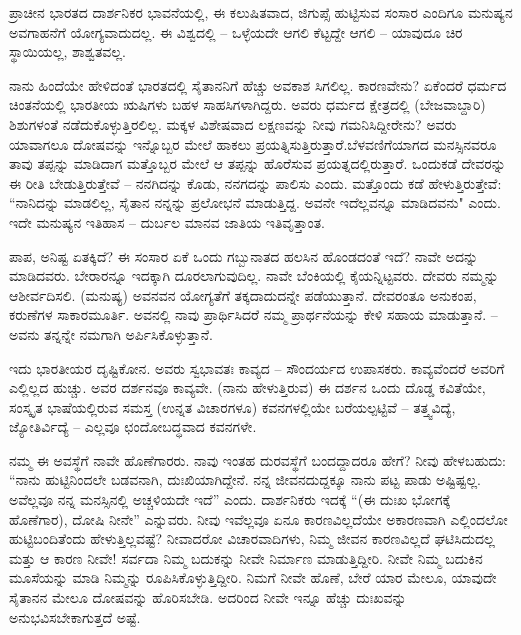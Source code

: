 \vskip 4pt

ಪ್ರಾಚೀನ ಭಾರತದ ದಾರ್ಶನಿಕರ ಭಾವನೆಯಲ್ಲಿ, ಈ ಕಲುಷಿತವಾದ, ಜಿಗುಪ್ಸೆ ಹುಟ್ಟಿಸುವ ಸಂಸಾರ ಎಂದಿಗೂ ಮನುಷ್ಯನ ಅವಗಾಹನೆಗೆ ಯೋಗ್ಯವಾದುದಲ್ಲ. ಈ ವಿಶ್ವದಲ್ಲಿ – ಒಳ್ಳೆಯದೇ ಆಗಲಿ ಕೆಟ್ಟದ್ದೇ ಆಗಲಿ – ಯಾವುದೂ ಚಿರ ಸ್ಥಾಯಿಯಲ್ಲ, ಶಾಶ್ವತವಲ್ಲ.

\vskip 4pt

ನಾನು ಹಿಂದೆಯೇ ಹೇಳಿದಂತೆ ಭಾರತದಲ್ಲಿ ಸೈತಾನನಿಗೆ ಹೆಚ್ಚು ಅವಕಾಶ ಸಿಗಲಿಲ್ಲ. ಕಾರಣವೇನು? ಏಕೆಂದರೆ ಧರ್ಮದ ಚಿಂತನೆಯಲ್ಲಿ ಭಾರತೀಯ ಋಷಿಗಳು ಬಹಳ ಸಾಹಸಿಗಳಾಗಿದ್ದರು. ಅವರು ಧರ್ಮದ ಕ್ಷೇತ್ರದಲ್ಲಿ (ಬೇಜವಾಬ್ದಾರಿ) ಶಿಶುಗಳಂತೆ ನಡೆದುಕೊಳ್ಳುತ್ತಿರಲಿಲ್ಲ. ಮಕ್ಕಳ ವಿಶೇಷವಾದ ಲಕ್ಷಣವನ್ನು ನೀವು ಗಮನಿಸಿದ್ದೀರೇನು? ಅವರು ಯಾವಾಗಲೂ ದೋಷವನ್ನು ಇನ್ನೊಬ್ಬರ ಮೇಲೆ ಹಾಕಲು ಪ್ರಯತ್ನಿಸುತ್ತಿರುತ್ತಾರೆ.\break ಬೆಳವಣಿಗೆಯಾಗದ ಮನಸ್ಸಿನವರೂ ತಾವು ತಪ್ಪನ್ನು ಮಾಡಿದಾಗ ಮತ್ತೊಬ್ಬರ ಮೇಲೆ ಆ ತಪ್ಪನ್ನು ಹೊರೆಸುವ ಪ್ರಯತ್ನದಲ್ಲಿರುತ್ತಾರೆ. ಒಂದುಕಡೆ ದೇವರನ್ನು ಈ ರೀತಿ ಬೇಡುತ್ತಿರುತ್ತೇವೆ – ನನಗಿದನ್ನು ಕೊಡು, ನನಗದನ್ನು ಪಾಲಿಸು ಎಂದು. ಮತ್ತೊಂದು ಕಡೆ ಹೇಳುತ್ತಿರುತ್ತೇವೆ: “ನಾನಿದನ್ನು ಮಾಡಲಿಲ್ಲ, ಸೈತಾನ ನನ್ನನ್ನು ಪ್ರಲೋಭನೆ ಮಾಡುತ್ತಿದ್ದ. ಅವನೇ ಇದೆಲ್ಲವನ್ನೂ ಮಾಡಿದವನು" ಎಂದು. ಇದೇ ಮನುಷ್ಯನ ಇತಿಹಾಸ – ದುರ್ಬಲ ಮಾನವ ಜಾತಿಯ ಇತಿವೃತ್ತಾಂತ.

\vskip 4pt

ಪಾಪ, ಅನಿಷ್ಟ ಏತಕ್ಕಿದೆ? ಈ ಸಂಸಾರ ಏಕೆ ಒಂದು ಗಬ್ಬುನಾತದ ಹಲಸಿನ ಹೊಂಡದಂತೆ ಇದೆ? ನಾವೇ ಅದನ್ನು ಮಾಡಿದವರು. ಬೇರಾರನ್ನೂ ಇದಕ್ಕಾಗಿ ದೂರಲಾಗುವುದಿಲ್ಲ. ನಾವೇ ಬೆಂಕಿಯಲ್ಲಿ ಕೈಯನ್ನಿಟ್ಟವರು. ದೇವರು ನಮ್ಮನ್ನು ಆಶೀರ್ವದಿಸಲಿ. (ಮನುಷ್ಯ) ಅವನವನ ಯೋಗ್ಯತೆಗೆ ತಕ್ಕದಾದುದನ್ನೇ ಪಡೆಯುತ್ತಾನೆ. ದೇವರಂತೂ ಅನುಕಂಪ, ಕರುಣೆಗಳ ಸಾಕಾರಮೂರ್ತಿ. ಅವನಲ್ಲಿ ನಾವು ಪ್ರಾರ್ಥಿಸಿದರೆ ನಮ್ಮ ಪ್ರಾರ್ಥನೆಯನ್ನು ಕೇಳಿ ಸಹಾಯ ಮಾಡುತ್ತಾನೆ. – ಅವನು ತನ್ನನ್ನೇ ನಮಗಾಗಿ ಅರ್ಪಿಸಿಕೊಳ್ಳುತ್ತಾನೆ.

\vskip 4pt

ಇದು ಭಾರತೀಯರ ದೃಷ್ಟಿಕೋನ. ಅವರು ಸ್ವಭಾವತಃ ಕಾವ್ಯದ – ಸೌಂದರ್ಯದ ಉಪಾಸಕರು. ಕಾವ್ಯವೆಂದರೆ ಅವರಿಗೆ ಎಲ್ಲಿಲ್ಲದ ಹುಚ್ಚು. ಅವರ ದರ್ಶನವೂ ಕಾವ್ಯವೇ. (ನಾನು ಹೇಳುತ್ತಿರುವ) ಈ ದರ್ಶನ ಒಂದು ದೊಡ್ಡ ಕವಿತೆಯೇ, ಸಂಸ್ಕೃತ ಭಾಷೆಯಲ್ಲಿರುವ ಸಮಸ್ತ (ಉನ್ನತ ವಿಚಾರಗಳೂ) ಕವನಗಳಲ್ಲಿಯೇ ಬರೆಯಲ್ಪಟ್ಟಿವೆ – ತತ್ತ್ವವಿದ್ಯೆ, ಜ್ಯೋತಿರ್ವಿದ್ಯೆ – ಎಲ್ಲವೂ ಛಂದೋಬದ್ಧವಾದ ಕವನಗಳೇ.

\vskip 4pt

ನಮ್ಮ ಈ ಅವಸ್ಥೆಗೆ ನಾವೇ ಹೊಣೆಗಾರರು. ನಾವು ಇಂತಹ ದುರವಸ್ಥೆಗೆ ಬಂದದ್ದಾದರೂ ಹೇಗೆ? ನೀವು ಹೇಳಬಹುದು: “ನಾನು ಹುಟ್ಟಿನಿಂದಲೇ ಬಡವನಾಗಿ, ದುಃಖಿಯಾಗಿದ್ದೇನೆ. ನನ್ನ ಜೀವನದುದ್ದಕ್ಕೂ ನಾನು ಪಟ್ಟ ಪಾಡು ಅಷ್ಟಿಷ್ಟಲ್ಲ. ಅವೆಲ್ಲವೂ ನನ್ನ ಮನಸ್ಸಿನಲ್ಲಿ ಅಚ್ಚಳಿಯದೇ ಇದೆ'' ಎಂದು. ದಾರ್ಶನಿಕರು ಇದಕ್ಕೆ “(ಈ ದುಃಖ ಭೋಗಕ್ಕೆ ಹೊಣೆಗಾರ), ದೋಷಿ ನೀನೇ'' ಎನ್ನುವರು. ನೀವು ಇವೆಲ್ಲವೂ ಏನೂ ಕಾರಣವಿಲ್ಲದೆಯೇ ಅಕಾರಣವಾಗಿ ಎಲ್ಲಿಂದಲೋ ಹುಟ್ಟಿಬಂದಿತೆಂದು ಹೇಳುತ್ತಿಲ್ಲವಷ್ಟೆ? ನೀವಾದರೋ ವಿಚಾರವಾದಿಗಳು, ನಿಮ್ಮ ಜೀವನ ಕಾರಣವಿಲ್ಲದೆ ಘಟಿಸಿದುದಲ್ಲ ಮತ್ತು ಆ ಕಾರಣ ನೀವೇ! ಸರ್ವದಾ ನಿಮ್ಮ ಬದುಕನ್ನು ನೀವೇ ನಿರ್ಮಾಣ ಮಾಡುತ್ತಿದ್ದೀರಿ. ನೀವೇ ನಿಮ್ಮ ಬದುಕಿನ ಮೂಸೆಯನ್ನು ಮಾಡಿ ನಿಮ್ಮನ್ನು ರೂಪಿಸಿಕೊಳ್ಳುತ್ತಿದ್ದೀರಿ. ನಿಮಗೆ ನೀವೇ ಹೊಣೆ, ಬೇರೆ ಯಾರ ಮೇಲೂ, ಯಾವುದೇ ಸೈತಾನನ ಮೇಲೂ ದೋಷವನ್ನು ಹೊರಿಸಬೇಡಿ. ಅದರಿಂದ ನೀವೇ ಇನ್ನೂ ಹೆಚ್ಚು ದುಃಖವನ್ನು ಅನುಭವಿಸಬೇಕಾಗುತ್ತದೆ ಅಷ್ಟೆ.

